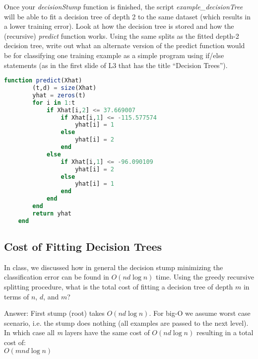 \documentclass{article}
\def\ans#1{\par\gre{Answer: #1}}
\def\blu#1{{\color{blu}#1}}
\def\gre#1{{\color{gre}#1}}
\begin{document}
Once your \emph{decisionStump} function is finished, the script \emph{example\_decisionTree} will be able to fit a decision tree of depth 2 to the same dataset (which results in a lower training error). Look at how the decision tree is stored and how the (recursive) \emph{predict} function works. \blu{Using the same splits as the fitted depth-2 decision tree, write out what an alternate version of the predict function would be for classifying one training example as a simple program using if/else statements (as in the first slide of L3 that has the title ``Decision Trees'').}

\begin{lstlisting}[language=julia]
	function predict(Xhat)
		(t,d) = size(Xhat)
		yhat = zeros(t)
		for i in 1:t
			if Xhat[i,2] <= 37.669007
				if Xhat[i,1] <= -115.577574
					yhat[i] = 1
				else
					yhat[i] = 2
				end
			else
				if Xhat[i,1] <= -96.090109
					yhat[i] = 2
				else
					yhat[i] = 1
				end
			end
		end
		return yhat
	end
\end{lstlisting}

\subsection{Cost of Fitting Decision Trees}

In class, we discussed how in general the decision stump minimizing the classification error can be found in $O(nd\log n)$ time. Using the greedy recursive splitting procedure, \blu{what is the total cost of fitting a decision tree of depth $m$ in terms of $n$, $d$, and $m$?} 

\ans{
	First stump (root) takes $O(nd\log{n})$. For big-O we assume worst case scenario, i.e. the stump does nothing (all examples are passed to the next level). In which case all \emph{m} layers have the same cost of $O(nd\log{n})$ resulting in a total cost of:\\
	$O(mnd\log{n})$
}
\end{document}
